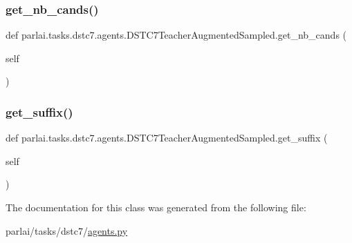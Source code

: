 \subsubsection{\texorpdfstring{get\+\_\+nb\+\_\+cands()}{get\_nb\_cands()}}
{\footnotesize\ttfamily def parlai.\+tasks.\+dstc7.\+agents.\+D\+S\+T\+C7\+Teacher\+Augmented\+Sampled.\+get\+\_\+nb\+\_\+cands (\begin{DoxyParamCaption}\item[{}]{self }\end{DoxyParamCaption})}

\mbox{\label{classparlai_1_1tasks_1_1dstc7_1_1agents_1_1DSTC7TeacherAugmentedSampled_ab52133c4ddb36400b28221e359f504e3}} 
\subsubsection{\texorpdfstring{get\+\_\+suffix()}{get\_suffix()}}
{\footnotesize\ttfamily def parlai.\+tasks.\+dstc7.\+agents.\+D\+S\+T\+C7\+Teacher\+Augmented\+Sampled.\+get\+\_\+suffix (\begin{DoxyParamCaption}\item[{}]{self }\end{DoxyParamCaption})}



The documentation for this class was generated from the following file\+:\begin{DoxyCompactItemize}
\item 
parlai/tasks/dstc7/\hyperlink{parlai_2tasks_2dstc7_2agents_8py}{agents.\+py}\end{DoxyCompactItemize}

